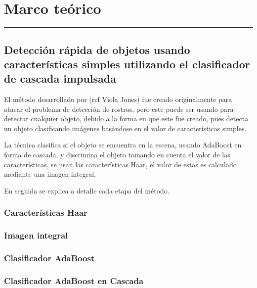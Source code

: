 \chapter{Marco te\'orico}\label{capit:cap2}
\vspace{-2.0325ex}%
\noindent
\rule{\textwidth}{0.5pt}
\vspace{-5.5ex}%
\newcommand{\pushline}{\Indp}%


\section{Detección rápida de objetos usando características simples utilizando el clasificador de cascada impulsada}\label{Detec}

El m\'etodo  desarrollado por (ref Viola Jones) fue creado originalmente para atacar el problema de detección de rostros, pero este puede ser usando para detectar cualquier objeto, debido a la forma en que este fue creado, pues detecta un objeto clasificando imágenes basándose en el valor de características simples.

La técnica clasifica si el objeto se encuentra en la escena, usando AdaBoost en forma de cascada, y discrimina el objeto tomando en cuenta el valor de las características, se usan las características Haar, el valor de estas es calculado mediante una imagen integral.

En seguida se explica a detalle cada etapa del método. 

\subsection{Características Haar}

\subsection{Imagen integral} 

\subsection{Clasificador AdaBoost}  

\subsection{Clasificador AdaBoost en Cascada} 




